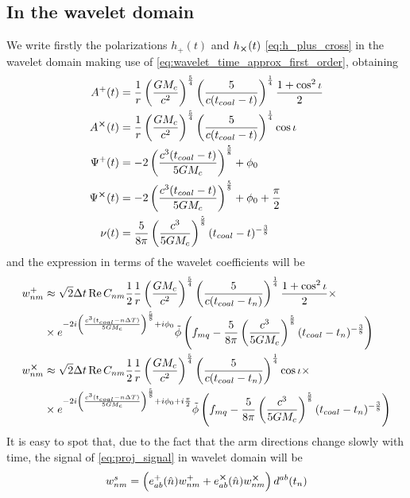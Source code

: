 \documentclass{article}
\begin{document}
\subsection{In the wavelet domain}
We write firstly the polarizations $h_+(t)$ and $h_{\cross}(t)$ \eqref{eq:h_plus_cross} in the wavelet domain making use of \eqref{eq:wavelet_time_approx_first_order}, obtaining
%
\begin{align}
A^+(t)&=\frac{1}{r}\left(\frac{GM_c}{c^2}\right)^{\frac{5}{4}}\left(\frac{5}{c(t_{coal}-t)}\right)^{\frac{1}{4}}\frac{1+\cos^2\iota}{2}\nonumber\\
A^{\cross}(t)&=\frac{1}{r}\left(\frac{GM_c}{c^2}\right)^{\frac{5}{4}}\left(\frac{5}{c(t_{coal}-t)}\right)^{\frac{1}{4}}\cos\iota\nonumber\\
\Psi^+(t)&=-2\left(\frac{c^3 (t_{coal}-t)}{5GM_c}\right)^{\frac 5 8}+\phi_0\nonumber\\
\Psi^{\cross}(t)&=-2\left(\frac{c^3 (t_{coal}-t)}{5GM_c}\right)^{\frac 5 8}+\phi_0+\frac{\pi}{2}\nonumber\\
\nu(t)&=\frac{5}{8\pi}\left(\frac{c^3}{5GM_c}\right)^{\frac 5 8}(t_{coal}-t)^{-\frac 3 8}
\end{align}
%
and the expression in terms of the wavelet coefficients will be
%
\begin{align}
\label{eq:wavelet_chirp}
w_{n m}^{+} &\approx \sqrt{2} \Delta t \Re C_{n m} \frac{1}{2} \frac{1}{r}\left(\frac{GM_c}{c^2}\right)^{\frac{5}{4}}\left(\frac{5}{c(t_{coal}-t_n)}\right)^{\frac{1}{4}}\frac{1+\cos^2\iota}{2}  \times\nonumber\\
&\times e^{-2i\left(\frac{c^3 (t_{coal}-n\Delta T)}{5GM_c}\right)^{\frac 5 8}+i\phi_0}\tilde{\phi}\left( f_{mq} -\frac{5}{8\pi}\left(\frac{c^3}{5GM_c}\right)^{\frac 5 8}(t_{coal}-t_n)^{-\frac 3 8} \right)\nonumber\\
w_{n m}^{\cross} &\approx \sqrt{2} \Delta t \Re C_{n m} \frac{1}{2} \frac{1}{r}\left(\frac{GM_c}{c^2}\right)^{\frac{5}{4}}\left(\frac{5}{c(t_{coal}-t_n)}\right)^{\frac{1}{4}}\cos\iota  \times\nonumber\\
&\times e^{-2i\left(\frac{c^3 (t_{coal}-n\Delta T)}{5GM_c}\right)^{\frac 5 8}+i\phi_0+i\frac{\pi}{2}}\tilde{\phi}\left( f_{mq} -\frac{5}{8\pi}\left(\frac{c^3}{5GM_c}\right)^{\frac 5 8}(t_{coal}-t_n)^{-\frac 3 8} \right)
\end{align}
%
It is easy to spot that, due to the fact that the arm directions change slowly with time, the signal of \eqref{eq:proj_signal} in wavelet domain will be
%
\begin{align}
w_{nm}^s=\left(e^+_{ab}(\hat n)w_{nm}^+ + e^{\cross}_{ab}(\hat n)w_{nm}^{\cross}\right)d^{ab}(t_n)
\end{align}

%
\end{document}
